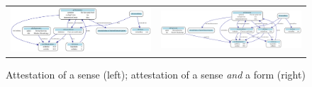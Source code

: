\documentclass[10pt]{article}
\begin{document}



 
 \begin{figure}
 \begin{tabular}{cc}
     	\includegraphics[width=\textheight, angle=90]{./example_1.pdf}  &  
     	\includegraphics[width=\textheight, angle=90]{./example_2.pdf}
 \end{tabular}

\caption{Attestation of a sense (left); attestation of a sense \textit{and} a form (right) }
\label{fig:ex2}
 \end{figure}









\end{document}
